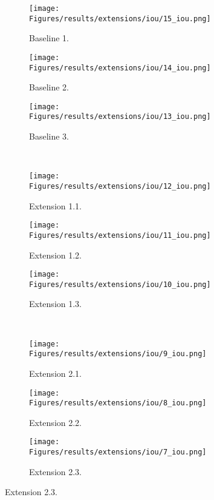 \begin{figure}[!htb]
    \centering
    \begin{subfigure}{.325\textwidth}
        \centering
        \texttt{[image: Figures/results/extensions/iou/15\_iou.png]}
        \caption{Baseline 1.}
    \end{subfigure}
    \begin{subfigure}{.325\textwidth}
        \centering
        \texttt{[image: Figures/results/extensions/iou/14\_iou.png]}
        \caption{Baseline 2.}
    \end{subfigure}
    \begin{subfigure}{.325\textwidth}
        \centering
        \texttt{[image: Figures/results/extensions/iou/13\_iou.png]}
        \caption{Baseline 3.}
    \end{subfigure}
    \\
    \begin{subfigure}{.325\textwidth}
        \centering
        \texttt{[image: Figures/results/extensions/iou/12\_iou.png]}
        \caption{Extension 1.1.}
    \end{subfigure}
    \begin{subfigure}{.325\textwidth}
        \centering
        \texttt{[image: Figures/results/extensions/iou/11\_iou.png]}
        \caption{Extension 1.2.}
    \end{subfigure}
    \begin{subfigure}{.325\textwidth}
        \centering
        \texttt{[image: Figures/results/extensions/iou/10\_iou.png]}
        \caption{Extension 1.3.}
    \end{subfigure}
    \\
    \begin{subfigure}{.325\textwidth}
        \centering
        \texttt{[image: Figures/results/extensions/iou/9\_iou.png]}
        \caption{Extension 2.1.}
    \end{subfigure}
    \begin{subfigure}{.325\textwidth}
        \centering
        \texttt{[image: Figures/results/extensions/iou/8\_iou.png]}
        \caption{Extension 2.2.}
    \end{subfigure}
    \begin{subfigure}{.325\textwidth}
        \centering
        \texttt{[image: Figures/results/extensions/iou/7\_iou.png]}
        \caption{Extension 2.3.}
    \end{subfigure}

\end{figure}
